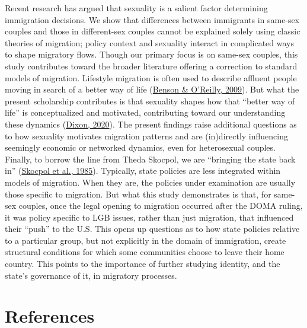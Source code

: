 \documentclass[
  11pt,
]{article}
\begin{document}
Recent research has argued that sexuality is a salient factor determining immigration decisions. We show that differences between immigrants in same-sex couples and those in different-sex couples cannot be explained solely using classic theories of migration; policy context and sexuality interact in complicated ways to shape migratory flows. Though our primary focus is on same-sex couples, this study contributes toward the broader literature offering a correction to standard models of migration. Lifestyle migration is often used to describe affluent people moving in search of a better way of life (\protect\hyperlink{ref-benson_2009}{Benson \& O'Reilly, 2009}). But what the present scholarship contributes is that sexuality shapes how that ``better way of life'' is conceptualized and motivated, contributing toward our understanding these dynamics (\protect\hyperlink{ref-dixon_2020}{Dixon, 2020}). The present findings raise additional questions as to how sexuality motivates migration patterns and are (in)directly influencing seemingly economic or networked dynamics, even for heterosexual couples. Finally, to borrow the line from Theda Skocpol, we are ``bringing the state back in'' (\protect\hyperlink{ref-skocpol_1985}{Skocpol et al., 1985}). Typically, state policies are less integrated within models of migration. When they are, the policies under examination are usually those specific to migration. But what this study demonstrates is that, for same-sex couples, once the legal opening to migration occurred after the DOMA ruling, it was policy specific to LGB issues, rather than just migration, that influenced their ``push'' to the U.S. This opens up questions as to how state policies relative to a particular group, but not explicitly in the domain of immigration, create structural conditions for which some communities choose to leave their home country. This points to the importance of further studying identity, and the state's governance of it, in migratory processes.

\hypertarget{references}{%
\section{References}\label{references}}

\setlength{\parindent}{-0.2in}
\setlength{\leftskip}{0.2in}
\setlength{\parskip}{8pt}

\noindent
\end{document}
